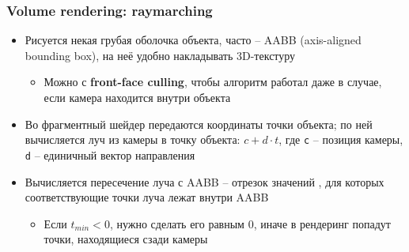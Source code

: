 \documentclass[10pt]{beamer}
\begin{document}
\begin{frame}[fragile]
\frametitle{Volume rendering: raymarching}
\begin{itemize}
\item Рисуется некая грубая оболочка объекта, часто -- AABB (axis-aligned bounding box), на неё удобно накладывать 3D-текстуру
\begin{itemize}
\item Можно с \textbf{front-face culling}, чтобы алгоритм работал даже в случае, если камера находится внутри объекта
\end{itemize}
\pause
\item Во фрагментный шейдер передаются координаты точки объекта; по ней вычисляется луч из камеры в точку объекта: \begin{math}c + d\cdot t\end{math}, где \verb|c| -- позиция камеры, \verb|d| -- единичный вектор направления
\pause
\item Вычисляется пересечение луча с AABB -- отрезок значений \begin{math}[t_{min}, t_{max}]\end{math}, для которых соответствующие точки луча лежат внутри AABB
\begin{itemize}
\item Если \begin{math}t_{min} < 0\end{math}, нужно сделать его равным 0, иначе в рендеринг попадут точки, находящиеся сзади камеры
\end{itemize}
\end{itemize}
\end{frame}
\end{document}
